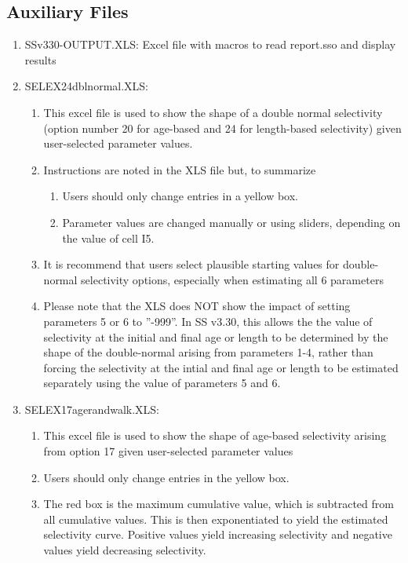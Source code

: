	
	\subsection{Auxiliary Files}
	\begin{enumerate}
		\item SSv330-OUTPUT.XLS:   Excel file with macros to read report.sso and display results
		\item SELEX24\textunderscore dbl\textunderscore normal.XLS:
		\begin{enumerate}
			\item This excel file is used to show the shape of a double normal selectivity (option number 20 for age-based and 24 for length-based selectivity) given user-selected parameter values.
			\item Instructions are noted in the XLS file but, to summarize
			\begin{enumerate}
				\item Users should only change entries in a yellow box. 
				\item Parameter values are changed manually or using sliders, depending on the value of cell I5.
			\end{enumerate}
			\item It is recommend that users select plausible starting values for double-normal selectivity options, especially when estimating all 6 parameters
			\item Please note that the XLS does NOT show the impact of setting parameters 5 or 6 to ''-999''.  In SS v3.30, this allows the the value of selectivity at the initial and final age or length to be determined by the shape of the double-normal arising from parameters 1-4, rather than forcing the selectivity at the intial and final age or length to be estimated separately using the value of parameters 5 and 6. 
		\end{enumerate}
		\item SELEX17\textunderscore age\textunderscore randwalk.XLS:
		\begin{enumerate}
			\item This excel file is used to show the shape of age-based selectivity arising from option 17 given user-selected parameter values
			\item Users should only change entries in the yellow box.
			\item The red box is the maximum cumulative value, which is subtracted from all cumulative values.  This is then exponentiated to yield the estimated selectivity curve.  Positive values yield increasing selectivity and negative values yield decreasing selectivity.

\end{enumerate}
\end{enumerate}
